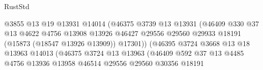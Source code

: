 \begin{lexlean}{RustStd}
\begin{coremodule}
                                            @3855
                                            @13
                                            @19
                                            @13931
                                            @14014
                                            (@46375
                                              @3739
                                              @13
                                              @13931
                                              (@46409
                                                @330
                                                @37
                                                @13
                                                @4622
                                                @4756
                                                @13908
                                                @13926
                                                @46427
                                                @29556
                                                @29560
                                                @29933
                                                @18191
                                                (@15873 (@18547 @13926 @13909))
                                                @17301))
                                            (@46395
                                              @3724
                                              @3668
                                              @13
                                              @18
                                              @13963
                                              @14013
                                              (@46375
                                                @3724
                                                @13
                                                @13963
                                                (@46409
                                                  @592
                                                  @37
                                                  @13
                                                  @4485
                                                  @4756
                                                  @13936
                                                  @13958
                                                  @46514
                                                  @29556
                                                  @29560
                                                  @30356
                                                  @18191

\end{coremodule}
\end{lexlean}
